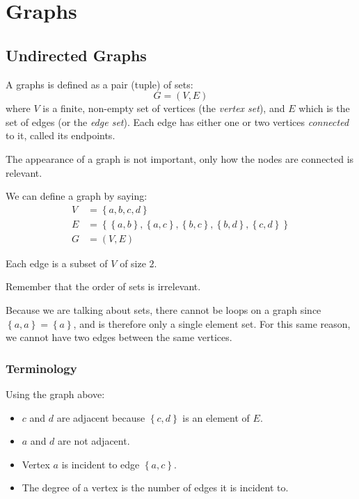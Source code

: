 \section{Graphs}\label{sec:pa_graphs}

\subsection{Undirected Graphs}\label{sub:undirected_graphs}

A graphs is defined as a pair (tuple) of sets:
\[
    G = (V, E)
\]
where \(V\) is a finite, non-empty set of vertices (the \emph{vertex set}), and \(E\) which is the set of edges (or the \emph{edge set}).
Each edge has either one or two vertices \emph{connected} to it, called its endpoints.
\begin{note}
    The appearance of a graph is not important, only how the nodes are connected is relevant.
\end{note}
We can define a graph by saying:
\begin{align*}
    V & = \left\{ a, b, c, d \right\}                                                                                                       \\
    E & = \left\{\left\{ a, b \right\}, \left\{ a, c \right\}, \left\{ b, c \right\}, \left\{ b, d \right\}, \left\{ c, d \right\} \right\} \\
    G & = \left(V, E\right)
\end{align*}
\begin{note}
    Each edge is a subset of \(V\) of size \(2\).
\end{note}
\begin{note}
    Remember that the order of sets is irrelevant.
\end{note}
Because we are talking about sets, there cannot be loops on a graph since \(\left\{ a, a \right\} = \left\{ a \right\} \), and is therefore only a single element set.
For this same reason, we cannot have two edges between the same vertices.

\subsubsection{Terminology}\label{ssub:graph_terminology}

Using the graph above:
\begin{itemize}
    \item \(c\) and \(d\) are adjacent because \(\left\{ c, d \right\}\) is an element of \(E\).
    \item \(a\) and \(d\) are not adjacent.
    \item Vertex \(a\) is incident to edge \(\left\{ a, c \right\} \).
    \item The degree of a vertex is the number of edges it is incident to.
\end{itemize}

